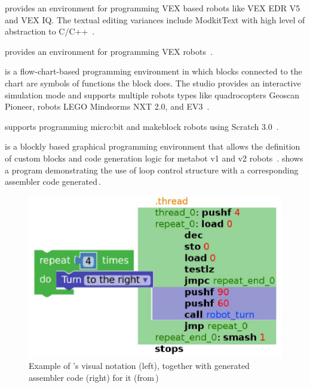 \parhead{\vex} provides an environment for programming VEX based robots like VEX EDR V5 and VEX IQ. 
The textual editing variances include ModkitText with high level of abstraction to C/C++~\cite{VexCodingStudio}.

\parhead{\robotmesh} provides an environment for programming VEX robots~\cite{RobotMeshStudio}. 

\parhead{\trik} is a flow-chart-based programming environment in which blocks connected to the chart are symbols of functions the block does. The studio provides an interactive simulation mode and supports multiple robots types like quadrocopters Geoscan Pioneer, robots LEGO Mindsorms NXT 2.0, and EV3~\cite{STRIKStudio, Mordvinov2017}. 

\parhead{\makeblock} supports programming micro:bit and makeblock robots using Scratch 3.0~\cite{Makeblock}. %

\parhead{\metabot} is a blockly based graphical programming environment that allows the definition of custom blocks and code generation logic for metabot v1 and v2 robots~\cite{Passault2016,Metabot}. %
 shows a program demonstrating the use of loop control structure with a corresponding assembler code generated\,\cite{Metabot,Passault2016}. 

\begin{figure}[t]
     \centering
    \includegraphics[width=.65\columnwidth]{metabotsample.jpg}
      \caption{Example of \metabot's visual notation (left), together with generated assembler code (right) for it (from\,\cite{Passault2016})}
      \label{metabot}
   \end{figure}



